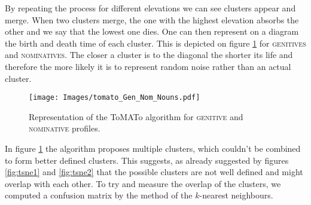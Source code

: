 \documentclass[11pt]{article}
\newcommand{\scsf}[1]{\textsc{\textsf{#1}}} %
\begin{document}
By repeating the process for different elevations we can see clusters appear and merge.
When two clusters merge, the one with the highest elevation absorbs the other and we say that the lowest one dies.
One can then represent on a diagram the birth and death time of each cluster.
This is depicted on figure \ref{fig:tomato1} for \scsf{genitives} and \scsf{nominatives}.
The closer a cluster is to the diagonal the shorter its life and therefore the more likely it is to represent random noise rather than an actual cluster.

\begin{figure}[h]
  \centering
  \vspace*{-12pt}
  \texttt{[image: Images/tomato\_Gen\_Nom\_Nouns.pdf]}
  \caption{Representation of the ToMATo algorithm for \scsf{genitive} and \scsf{nominative} profiles.}
  \label{fig:tomato1}
\end{figure}

In figure \ref{fig:tomato1} the algorithm proposes multiple clusters, which couldn't be combined to form better defined clusters. 
This suggests, as already suggested by figures \ref{fig:tsne1} and \ref{fig:tsne2} that the possible clusters are not well defined and might overlap with each other. 
To try and measure the overlap of the clusters, we computed a confusion matrix by the method of the $k$-nearest neighbours. 
\end{document}

